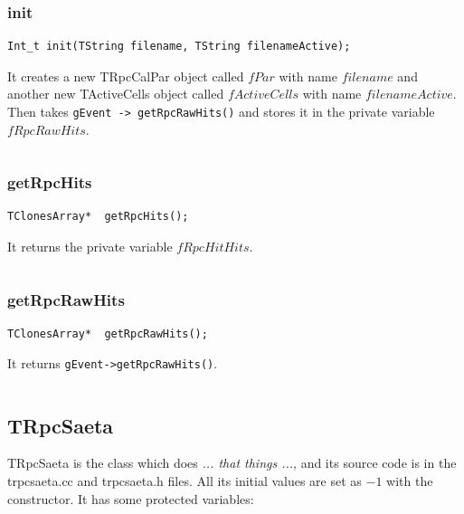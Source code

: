 \documentclass[a4paper]{book}
\begin{document}
\[\]

\subsubsection{init}

\begin{lstlisting}
Int_t init(TString filename, TString filenameActive);
\end{lstlisting}

It creates a new TRpcCalPar object called $fPar$ with name $filename$ and another new TActiveCells object called $fActiveCells$ with name $filenameActive$. Then takes \texttt{gEvent -> getRpcRawHits()} and stores it in the private variable $fRpcRawHits$.

\[\]

\subsubsection{getRpcHits}

\begin{lstlisting}
TClonesArray*  getRpcHits();
\end{lstlisting}

It returns the private variable $fRpcHitHits$.

\[\]

\subsubsection{getRpcRawHits}

\begin{lstlisting}
TClonesArray*  getRpcRawHits();
\end{lstlisting}

It returns \texttt{gEvent->getRpcRawHits()}.

\[\]

\subsection{TRpcSaeta}

TRpcSaeta is the class which does \textit{... that things ...}, and its source code is in the trpcsaeta.cc and trpcsaeta.h files. All its initial values are set as $-1$ with the constructor. It has some protected variables:
\end{document}
